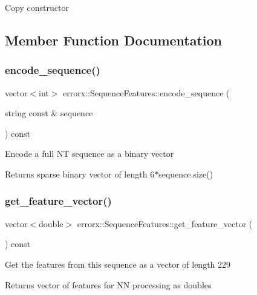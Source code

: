Copy constructor 

\subsection{Member Function Documentation}
\mbox{\label{classerrorx_1_1_sequence_features_aecea6d891f4f91631b8d696882d0af7a}} 
\subsubsection{\texorpdfstring{encode\+\_\+sequence()}{encode\_sequence()}}
{\footnotesize\ttfamily vector$<$int$>$ errorx\+::\+Sequence\+Features\+::encode\+\_\+sequence (\begin{DoxyParamCaption}\item[{string const \&}]{sequence }\end{DoxyParamCaption}) const}

Encode a full NT sequence as a binary vector

\begin{DoxyReturn}{Returns}
sparse binary vector of length 6$\ast$sequence.size() 
\end{DoxyReturn}
\mbox{\label{classerrorx_1_1_sequence_features_acef9190004088f796ed80cfd32528c47}} 
\subsubsection{\texorpdfstring{get\+\_\+feature\+\_\+vector()}{get\_feature\_vector()}}
{\footnotesize\ttfamily vector$<$double$>$ errorx\+::\+Sequence\+Features\+::get\+\_\+feature\+\_\+vector (\begin{DoxyParamCaption}{ }\end{DoxyParamCaption}) const}

Get the features from this sequence as a vector of length 229

\begin{DoxyReturn}{Returns}
vector of features for NN processing as doubles 
\end{DoxyReturn}
\mbox{\label{classerrorx_1_1_sequence_features_a1745dab8123b3da0a8412540ece75b0e}} 
